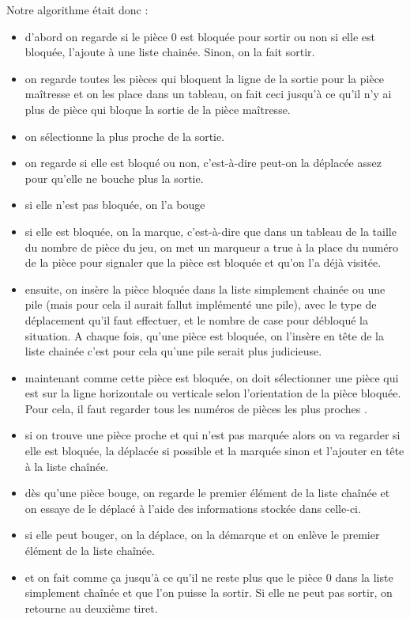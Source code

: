 \documentclass{report}
\begin{document}
Notre algorithme était donc :
\begin{itemize}
\item d'abord on regarde si le pièce 0 est bloquée pour sortir ou  non si elle est bloquée, l'ajoute à une liste chainée. Sinon, on la fait sortir.
\item on regarde toutes les pièces qui bloquent la ligne de la sortie pour la pièce maîtresse et on les place dans un tableau, on fait ceci jusqu'à ce qu'il n'y ai plus de pièce qui bloque la sortie de la pièce maîtresse.
\item on sélectionne la plus proche de la sortie.
\item on regarde si elle est bloqué ou non, c'est-à-dire peut-on la déplacée assez pour qu'elle ne bouche plus la sortie.
\item si elle n'est pas bloquée, on l'a bouge
\item si elle est bloquée, on la marque, c'est-à-dire que dans un tableau de la taille du nombre de pièce du jeu, on met un marqueur a true à la place du numéro de la  pièce pour signaler que la pièce est bloquée et qu'on l'a déjà visitée.
\item ensuite, on insère la pièce bloquée dans la liste simplement chainée ou une pile (mais pour cela il aurait fallut implémenté une pile), avec le type de déplacement qu'il faut effectuer, et le nombre de case pour débloqué la situation. A chaque fois, qu'une pièce est bloquée, on l'insère en tête de la liste chainée c'est pour cela qu'une pile serait plus judicieuse.
\item maintenant comme cette pièce est bloquée, on doit sélectionner une pièce qui est sur la ligne horizontale ou verticale selon l'orientation de la pièce bloquée. Pour cela, il faut regarder tous les numéros de pièces les plus proches .
\item si on trouve une pièce proche et qui n'est pas marquée alors on va regarder si elle est bloquée, la déplacée si possible et la marquée sinon et l'ajouter en tête à la liste chaînée.
\item dès qu'une pièce bouge, on regarde le premier élément de la liste chaînée et on essaye de le déplacé à l'aide des informations stockée dans celle-ci.
\item si elle peut bouger, on la déplace, on la démarque et on enlève le premier élément de la liste chaînée.
\item et on fait comme ça jusqu'à ce qu'il ne reste plus que le pièce 0 dans la liste simplement chaînée et que l'on puisse la sortir. Si elle ne peut pas sortir, on retourne au deuxième tiret. 
\end{itemize}
\end{document}
